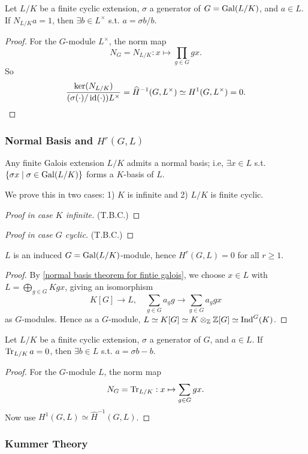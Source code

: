 \begin{corollary}[Hilbert 90]\label{Hilbert 90 - multiplicative}
    Let $L/K$ be a finite cyclic extension, $\sigma$ a generator of $G = \operatorname{Gal}(L/K)$, and $a\in L$.
    If $N_{L/K}a = 1$, then $\exists b\in L^\times$ s.t. $a = \sigma b/b$.
\end{corollary}
\begin{proof}
    For the $G$-module $L^\times$, the norm map \[N_G = N_{L/K} : x\mapsto\prod_{g\in G}  gx.\]
    So \[\dfrac{\ker(N_{L/K})}{(\sigma(\cdot) / \operatorname{id}(\cdot))L^\times} = \widehat H^{-1}(G, L^\times) \simeq H^1(G, L^\times) = 0.\qedhere\]
\end{proof}

\subsubsection{Normal Basis and \texorpdfstring{$H^r(G, L)$}{Hr(G, L)}}

\begin{theorem}\label{normal basis theorem for fintie galois}
    Any finite Galois extension $L/K$ admits a normal basis; i.e, $\exists x\in L$ s.t. $\{\sigma x\mid \sigma\in\operatorname{Gal}(L/K)\}$ forms a $K$-basis of $L$.
\end{theorem}
We prove this in two cases: 1) $K$ is infinite
and 2) $L/K$ is finite cyclic.
\begin{proof}[Proof in case $K$ infinite]
    (T.B.C.)
\end{proof}

\begin{proof}[Proof in case $G$ cyclic]
    (T.B.C.)
\end{proof}

\begin{proposition}
    $L$ is an induced $G = \operatorname{Gal}(L/K)$-module, hence
    $H^r(G, L) = 0$ for all $r \ge 1$.
\end{proposition}
\begin{proof}
    By \cref{normal basis theorem for fintie galois},
    we choose $x\in L$ with $L = \bigoplus_{g\in G} Kgx$, giving an isomorphism \[K[G]\to L,\quad \sum_{g\in G}a_gg\to\sum_{g\in G}a_ggx\]
    as $G$-modules. Hence as a $G$-module,
    $L\simeq K[G]\simeq K\otimes_{\mathbb{Z}} \mathbb{Z}[G]\simeq\operatorname{Ind}^G(K)$.
\end{proof}

\begin{corollary}\label{Hilbert 90 - additive}
    Let $L/K$ be a finite cyclic extension, $\sigma$ a generator of $G$, and $a\in L$.
    If $\operatorname{Tr}_{L/K}a = 0$,
    then $\exists b\in L$ s.t. $a = \sigma b - b$.
\end{corollary}
\begin{proof}
    For the $G$-module $L$, the norm map \[N_G = \operatorname{Tr}_{L/K} : x\mapsto \sum_{g\in G}gx.\]
    Now use $H^{1}(G, L) \simeq \hat H^{-1}(G, L)$.
\end{proof}

\subsubsection{Kummer Theory}



